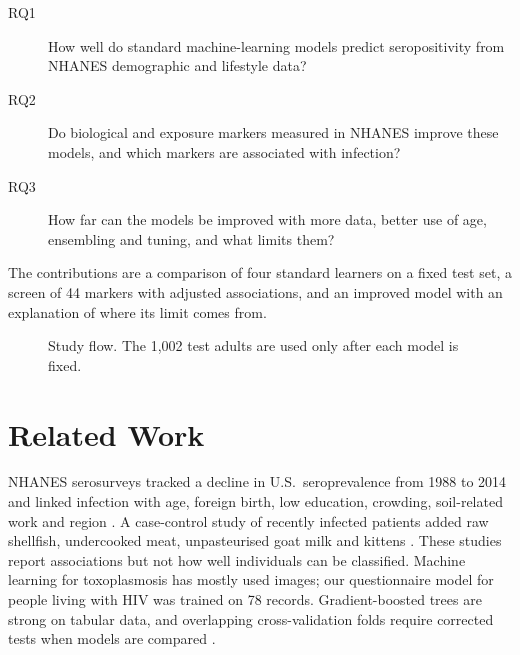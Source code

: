 \documentclass[conference]{IEEEtran}
\begin{document}
\begin{description}
\item[RQ1] How well do standard machine-learning models predict seropositivity from NHANES demographic and lifestyle data?
\item[RQ2] Do biological and exposure markers measured in NHANES improve these models, and which markers are associated with infection?
\item[RQ3] How far can the models be improved with more data, better use of age, ensembling and tuning, and what limits them?
\end{description}

The contributions are a comparison of four standard learners on a fixed test set, a screen of 44 markers with adjusted associations,
and an improved model with an explanation of where its limit comes from.

\begin{figure}[t]
\centering
{}
\caption{Study flow. The 1,002 test adults are used only after each model is fixed.}
\label{fig:flow}
\end{figure}

\section{Related Work}
NHANES serosurveys tracked a decline in U.S.\ seroprevalence from 1988 to 2014 and linked infection with age, foreign birth, low
education, crowding, soil-related work and region \cite{jones2001,jones2014,jones2018}. A case-control study of recently infected
patients added raw shellfish, undercooked meat, unpasteurised goat milk and kittens \cite{jones2009}. These studies report associations
but not how well individuals can be classified. Machine learning for toxoplasmosis has mostly used images; our questionnaire model for
people living with HIV \cite{ichwan2025} was trained on 78 records. Gradient-boosted trees \cite{xgboost,lightgbm} are strong on tabular
data, and overlapping cross-validation folds require corrected tests when models are compared \cite{nadeau2003}.
\end{document}
